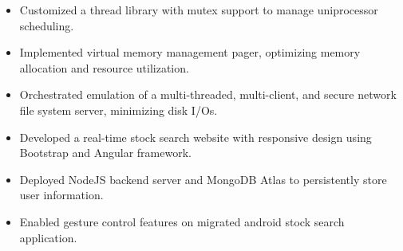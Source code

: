 \documentclass[10pt,a4paper]{altacv}
\begin{document}

\begin{itemize}
	\item Customized a thread library with mutex support to manage uniprocessor scheduling.
	\item Implemented virtual memory management pager, optimizing memory allocation and resource utilization.
	\item Orchestrated emulation of a multi-threaded, multi-client, and secure network file system server, minimizing disk I/Os.
\end{itemize}

\begin{itemize}
	\item Developed a real-time stock search website with responsive design using Bootstrap and Angular framework. %
	\item Deployed NodeJS backend server and MongoDB Atlas to persistently store user information.
	\item Enabled gesture control features on migrated android stock search application.
\end{itemize}
\end{document}
